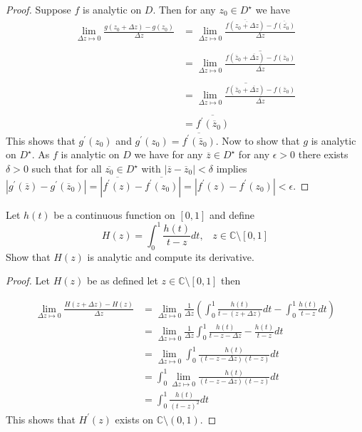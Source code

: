 \documentclass[letter,12pt]{article}
\begin{document}
\begin{proof}
    Suppose $f$ is analytic on $D$. Then for any $z_0\in D^\star$ we have \begin{align*}
    \lim_{\Delta z\mapsto 0} \frac{g(z_0+\Delta z)-g(z_0)}{\Delta z } &= \lim_{\Delta z\mapsto 0} \frac{\overline{f(\overline{z_0+\Delta z})}-\overline{f(\overline{z_0})}}{\Delta z }\\ \\
    &= \lim_{\Delta z\mapsto 0}\overline{\frac{f(\bar z_0 + \overline{\Delta z})- f(\overline z_0)}{\overline {\Delta z}}}\\ \\
    &= \overline{\lim_{\Delta z\mapsto 0}\frac{f(\bar z_0 + \overline{\Delta z})- f(\overline z_0)}{\overline {\Delta z}}}\\ \\
    &= \overline{f^\prime(\overline z_0)}
    \end{align*}
This shows that $g^\prime(z_0)$ and $g^\prime(z_0)=\overline{f^\prime (\bar z_0)}$. 
Now to show that $g$ is analytic on $D^\star$. As $f$ is analytic on $D$ we have for any $\overline{z}\in D^\star$ for any $\epsilon>0$ there exists $\delta >0$ such that for all $\overline{z_0}\in D^\star$ with $|\overline z- \overline z_0|<\delta$ implies $|g^\prime{(\overline{z})}-g^\prime (\overline z_0)|=|\overline{f^\prime (z)}-\overline{f^\prime (z_0)}|=|f^{\prime}(z)-f^\prime(z_0)|<\epsilon$.  
\end{proof}
\begin{tcolorbox}
    Let $h(t)$ be a continuous function on $[0,1]$ and define 
        \[
        H(z)=\int_0^1\frac{h(t)}{t-z}dt, \; \; \; z\in \mathbb{C}\setminus [0,1]
        \]
        Show that $H(z)$ is analytic and compute its derivative.
\end{tcolorbox}

\begin{proof}
    Let $H(z)$ be as defined let $z\in \mathbb{C}\setminus [0,1]$ then 

    \begin{align*}
        \lim_{\Delta z\mapsto 0}\frac{H(z+\Delta z)-H(z)}{\Delta z}&= \lim_{\Delta z\mapsto 0}\frac{1}{\Delta z}\left(\int_0^1\frac{h(t)}{t-(z+\Delta z)}dt -\int_0^1 \frac{h(t)}{t-z}dt \right)\\
        &= \lim_{\Delta z\mapsto 0}\frac{1}{\Delta z}\int_0^1\frac{h(t)}{t-z-\Delta z}-\frac{h(t)}{t-z}dt\\
        &= \lim_{\Delta z\mapsto 0}\int_0^1\frac{h(t)}{(t-z-\Delta z)(t-z)}dt\\ 
        &= \int_0^1\lim_{\Delta z\mapsto 0}\frac{h(t)}{(t-z-\Delta z)(t-z)}dt\\
        &= \int_0^1\frac{h(t)}{(t-z)^2}dt
    \end{align*}
    This shows that $H^\prime(z)$ exists on $\mathbb{C}\setminus (0,1)$.

\end{proof}
\end{document}
